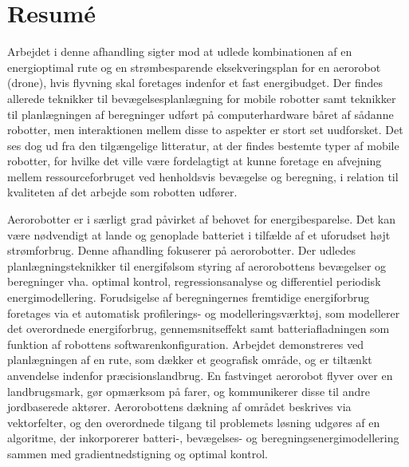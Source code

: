 
\cleardoublepage


\chapter*{Resum{\'e}}

\vspace*{-1.8ex}

Arbejdet i denne afhandling sigter mod at udlede kombinationen af en energioptimal rute og en str{\o}mbesparende eksekveringsplan for en aerorobot (drone), hvis flyvning skal foretages indenfor et fast energibudget. Der findes allerede teknikker til bev{\ae}gelsesplanl{\ae}gning for mobile robotter samt teknikker til planl{\ae}gningen af beregninger udf{\o}rt p{\aa} computerhardware b{\aa}ret af s{\aa}danne robotter, men interaktionen mellem disse to aspekter er stort set uudforsket. Det ses dog ud fra den tilg{\ae}ngelige litteratur, at der findes bestemte typer af mobile robotter, for hvilke det ville v{\ae}re fordelagtigt at kunne foretage en afvejning mellem ressourceforbruget ved henholdsvis bev{\ae}gelse og beregning, i relation til kvaliteten af det arbejde som robotten udf{\o}rer.
 
Aerorobotter er i s{\ae}rligt grad p{\aa}virket af behovet for energibesparelse. Det kan v{\ae}re %
n{\o}dvendigt at lande og genoplade batteriet i tilf{\ae}lde af et uforudset h{\o}jt str{\o}mforbrug. Denne afhandling fokuserer p{\aa} aerorobotter. Der udledes planl{\ae}gningsteknikker til energif{\o}lsom styring af aerorobottens bev{\ae}gelser og beregninger %
vha. optimal kontrol, regressionsanalyse og differentiel periodisk energimodellering. Forudsigelse af beregningernes fremtidige energiforbrug foretages via et automatisk profilerings- og modelleringsv{\ae}rkt{\o}j, som modellerer det overordnede energiforbrug, gennemsnitseffekt samt batteriafladningen som funktion af robottens softwarenkonfiguration. Arbejdet demonstreres ved planl{\ae}gningen af en rute, som d{\ae}kker et geografisk omr{\aa}de, og er tilt{\ae}nkt anvendelse indenfor pr{\ae}cisionslandbrug. En fastvinget aerorobot flyver over en landbrugsmark, g{\o}r opm{\ae}rksom p{\aa} farer, og kommunikerer disse til andre jordbaserede akt{\o}rer. Aerorobottens d{\ae}kning af omr{\aa}det beskrives via vektorfelter, og den overordnede tilgang til problemets l{\o}sning udg{\o}res af en algoritme, der inkorporerer batteri-, bev{\ae}gelses- og beregningsenergimodellering sammen med gradientnedstigning og optimal kontrol.
 
